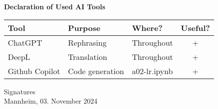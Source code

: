 \documentclass[a4paper,oneside,bibliography=totoc]{scrartcl}
\begin{document}
\begin{center}
  \textbf{Declaration of Used AI Tools} \\[.3em]
  \begin{tabularx}{\textwidth}{lXlc}
    \toprule
    Tool & Purpose & Where? & Useful? \\
    \midrule
    ChatGPT & Rephrasing & Throughout & + \\
    DeepL & Translation & Throughout & + \\
    Github Copilot & Code generation & a02-lr.ipynb & + \\
    \bottomrule
  \end{tabularx}
\end{center}

\vspace{2cm}
\noindent Signatures\\
\noindent Mannheim, 03. November 2024 \hfill
\end{document}
